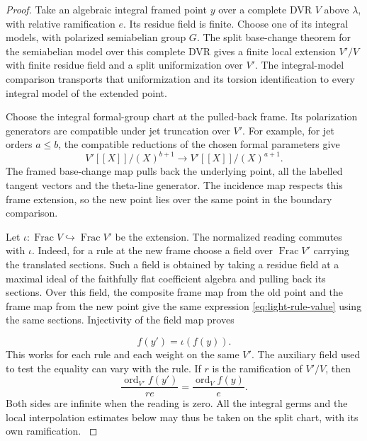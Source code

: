 \begin{proof}
Take an algebraic integral framed point \(y\) over a complete
DVR \(V\) above \(\lambda\), with relative ramification \(e\).
Its residue field is finite. Choose one of its integral models,
with polarized semiabelian group \(G\). The split base-change
theorem for the semiabelian model over this complete DVR gives
a finite local extension \(V'/V\) with finite residue field and a
split uniformization over \(V'\). The integral-model comparison
transports that uniformization and its torsion identification to
every integral model of the extended point.

Choose the
integral formal-group chart at the pulled-back frame. Its
polarization generators are compatible under jet truncation
over \(V'\).
For example, for jet orders \(a\le b\), the compatible reductions of the chosen formal parameters give
\[
  V'[\![X]\!]/(X)^{b+1}\longrightarrow V'[\![X]\!]/(X)^{a+1}.
\]
 The framed base-change map pulls back the
underlying point, all the labelled tangent vectors and the
theta-line generator. The incidence map respects this frame
extension, so the new point lies over the same point in the
boundary comparison. \label{cor:slice-light-integral-2}

Let \(\iota:\operatorname{Frac}V\hookrightarrow\operatorname{Frac}V'\)
be the extension. The normalized reading commutes with \(\iota\).
Indeed, for a rule at the new frame choose a field over
\(\operatorname{Frac}V'\) carrying the translated sections. Such
a field is obtained by taking a residue field at a maximal ideal of
the faithfully flat coefficient algebra and pulling back its
sections. Over this field, the composite frame map from the old
point and the frame map from the new point give the same
expression \eqref{eq:light-rule-value} using the same sections.
Injectivity of the field map proves

\[
  f(y')=\iota(f(y)).
\]
 This works for each rule and each weight
on the same \(V'\). The auxiliary field used to test the equality
can vary with the rule. If \(r\) is the ramification of
\(V'/V\), then
\begin{equation}\label{eq:light-frame-order}
 \frac{\operatorname{ord}_{V'} f(y')}{re}
        =\frac{\operatorname{ord}_{V} f(y)}{e}.
\end{equation}
Both sides are infinite when the reading is zero. All the
integral germs and the local interpolation estimates below may
thus be taken on the split chart, with its own ramification.
\label{cor:slice-light-integral-3}


\end{proof}
